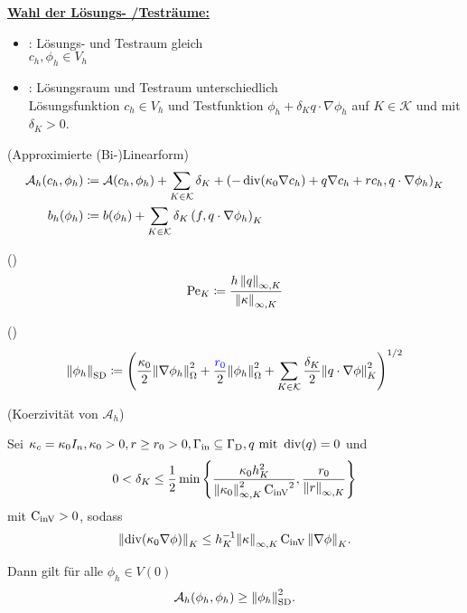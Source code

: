 \underline{\textbf{Wahl der Lösungs- /Testräume:}}
\begin{itemize}
	\item {}: Lösungs- und Testraum gleich\\ $ c_h, \phi_h \in V_h$
	\item {}: Lösungsraum und Testraum unterschiedlich\\ Lösungsfunktion $ c_h \in V_h $ und Testfunktion $ \phi_h + \delta_K q \cdot \nabla \phi_h $ auf $ K \in \mathcal{K} $ und mit $ \delta_K > 0 $.
\end{itemize}

\begin{define}(Approximierte (Bi-)Linearform)
	\begin{align*}
		\mathcal{A}_h(c_h, \phi_h) &\coloneqq \mathcal{A}(c_h, \phi_h) + \sum_{K \in \mathcal{K}} \delta_K + \left(-\operatorname{div}(\kappa_0 \nabla c_h) + q \nabla c_h + r c_h, q \cdot \nabla \phi_h\right)_K \\
		b_h(\phi_h) &\coloneqq b(\phi_h) + \sum_{K \in \mathcal{K}} \delta_K \left( f, q\cdot \nabla \phi_h \right)_K
	\end{align*}
\end{define}

\begin{define}()
	\[ \operatorname{Pe}_K \coloneqq \frac{h \, \norm{q}_{\infty, K}}{\norm{\kappa}_{\infty, K}} \]
\end{define}

\begin{define}()
	 \[ \norm{\phi_h}_{\operatorname{\text{SD}}} \coloneqq \left( \frac{\kappa_0}{2} \norm{\nabla \phi_h}_\Omega^2 + \frac{\textcolor{blue}{r_0}}{2} \norm{\phi_h}_\Omega^2+ \sum_{K \in \mathcal{K}} \frac{\delta_K}{2} \norm{q \cdot \nabla \phi}_K^2  \right)^{1/2}  \]
\end{define}

\begin{Lemma}(Koerzivität von $ \mathcal{A}_h $)
	
	Sei $ \kappa_c = \kappa_0 I_n, \kappa_0 > 0, r \geq r_0 > 0, \Gamma_{{\text{in}}} \subseteq \Gamma_{\text{D}}, q \text{ mit } \operatorname{div}(q) = 0 $ und \[ 0 < \delta_K \leq \frac{1}{2} \min\left\{ \frac{\kappa_0 h_K^2}{\norm{\kappa_0}_{\infty,K}^2 \operatorname{C_{\text{inV}}}^2} , \frac{r_0}{\norm{r}_{\infty, K}}   \right\}\] mit $ \operatorname{C_{\text{inV}}} > 0 $, sodass  \[ \norm{\operatorname{div}(\kappa_0 \nabla \phi)}_K \leq h_K^{-1} \norm{\kappa}_{\infty,K} \operatorname{C_{\text{inV}}} \norm{\nabla \phi}_K. \]
	
	Dann gilt für alle $ \phi_h \in V(0) $
	\[ \mathcal{A}_h(\phi_h, \phi_h) \geq \norm{\phi_h}_{\operatorname{\text{SD}}}^2. \]
	
	
\end{Lemma}
